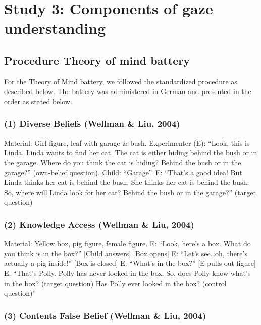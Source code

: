 \documentclass[
  man,floatsintext]{apa7}
\begin{document}
\section{Study 3: Components of gaze understanding}\label{study-3-components-of-gaze-understanding}

\subsection{Procedure Theory of mind battery}\label{procedure-theory-of-mind-battery}

For the Theory of Mind battery, we followed the standardized procedure as described below. The battery was administered in German and presented in the order as stated below.

\subsubsection{(1) Diverse Beliefs (Wellman \& Liu, 2004)}\label{diverse-beliefs-wellman2004scaling}

Material: Girl figure, leaf with garage \& bush.
Experimenter (E): ``Look, this is Linda. Linda wants to find her cat. The cat is either hiding behind the bush or in the garage. Where do you think the cat is hiding? Behind the bush or in the garage?'' (own-belief question). Child: ``Garage''. E: ``That's a good idea! But Linda thinks her cat is behind the bush. She thinks her cat is behind the bush. So, where will Linda look for her cat? Behind the bush or in the garage?'' (target question)

\subsubsection{(2) Knowledge Access (Wellman \& Liu, 2004)}\label{knowledge-access-wellman2004scaling}

Material: Yellow box, pig figure, female figure.
E: ``Look, here's a box. What do you think is in the box?'' {[}Child answers{]} {[}Box opens{]} E: ``Let's see\ldots oh, there's actually a pig inside!'' {[}Box is closed{]} E: ``What's in the box?'' {[}E pulls out figure{]} E: ``That's Polly. Polly has never looked in the box. So, does Polly know what's in the box? (target question) Has Polly ever looked in the box? (control question)''

\subsubsection{(3) Contents False Belief (Wellman \& Liu, 2004)}\label{contents-false-belief-wellman2004scaling}
\end{document}
